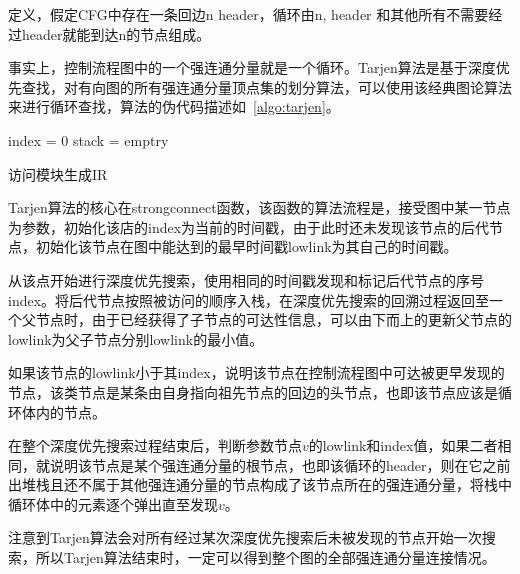 定义，假定CFG中存在一条回边n \Leftarrow header，循环由n, header 和其他所有不需要经过header就能到达n的节点组成。

事实上，控制流程图中的一个强连通分量就是一个循环。Tarjen算法\cite{doi:10.1137/0201010}是基于深度优先查找，对有向图的所有强连通分量顶点集的划分算法，可以使用该经典图论算法来进行循环查找，算法的伪代码描述如~\ref{algo:tarjen}。

\begin{algorithm}[htb]
  \small
  \SetAlgoLined
  
  index = 0\;
  stack = emptry\;
  \caption{访问模块生成IR}
  \label{algo:tarjen}
\end{algorithm}

Tarjen算法的核心在strongconnect函数，该函数的算法流程是，接受图中某一节点为参数，初始化该店的index为当前的时间戳，由于此时还未发现该节点的后代节点，初始化该节点在图中能达到的最早时间戳lowlink为其自己的时间戳。

从该点开始进行深度优先搜索，使用相同的时间戳发现和标记后代节点的序号index。将后代节点按照被访问的顺序入栈，在深度优先搜索的回溯过程返回至一个父节点时，由于已经获得了子节点的可达性信息，可以由下而上的更新父节点的lowlink为父子节点分别lowlink的最小值。

如果该节点的lowlink小于其index，说明该节点在控制流程图中可达被更早发现的节点，该类节点是某条由自身指向祖先节点的回边的头节点，也即该节点应该是循环体内的节点。

在整个深度优先搜索过程结束后，判断参数节点$v$的lowlink和index值，如果二者相同，就说明该节点是某个强连通分量的根节点，也即该循环的header，则在它之前出堆栈且还不属于其他强连通分量的节点构成了该节点所在的强连通分量，将栈中循环体中的元素逐个弹出直至发现$v$。

注意到Tarjen算法会对所有经过某次深度优先搜索后未被发现的节点开始一次搜索，所以Tarjen算法结束时，一定可以得到整个图的全部强连通分量连接情况。

